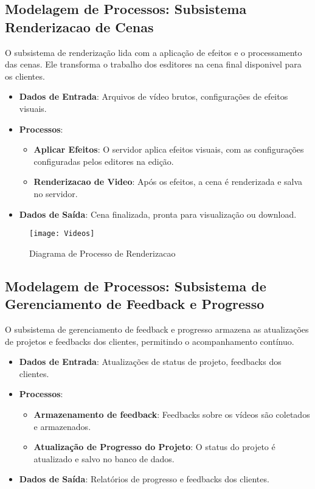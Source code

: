\subsection{Modelagem de Processos: Subsistema Renderizacao de Cenas}
O subsistema de renderização lida com a aplicação de efeitos e o processamento das cenas. Ele transforma o trabalho dos esditores na cena final disponivel para os clientes.

\begin{itemize}
    \item \textbf{Dados de Entrada}: Arquivos de vídeo brutos, configurações de efeitos visuais.
    \item \textbf{Processos}:
        \begin{itemize}
            \item \textbf{Aplicar Efeitos}: O servidor aplica efeitos visuais, com as configurações configuradas pelos editores na edição.
            \item \textbf{Renderizacao de Video}: Após os efeitos, a cena é renderizada e salva no servidor.
        \end{itemize}
    \item \textbf{Dados de Saída}: Cena finalizada, pronta para visualização ou download.
\end{itemize}

\begin{figure}[ht]
    \centering
    \texttt{[image: Videos]}
    \caption{Diagrama de Processo de Renderizacao}
    \label{fig:diagram1}
\end{figure}

\pagebreak
\newpage

\subsection{Modelagem de Processos: Subsistema de Gerenciamento de Feedback e Progresso}
O subsistema de gerenciamento de feedback e progresso armazena as atualizações de projetos e feedbacks dos clientes, permitindo o acompanhamento contínuo.

\begin{itemize}
    \item \textbf{Dados de Entrada}: Atualizações de status de projeto, feedbacks dos clientes.
    \item \textbf{Processos}:
        \begin{itemize}
            \item \textbf{Armazenamento de feedback}: Feedbacks sobre os vídeos são coletados e armazenados.
            \item \textbf{Atualização de Progresso do Projeto}: O status do projeto é atualizado e salvo no banco de dados.
        \end{itemize}
    \item \textbf{Dados de Saída}: Relatórios de progresso e feedbacks dos clientes.
\end{itemize}

